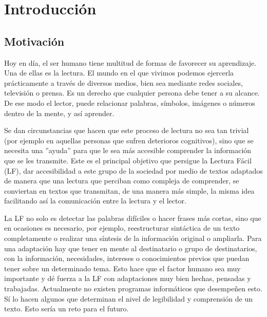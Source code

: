 \chapter{Introducción}
\label{cap:introduccion}


\section{Motivación}
Hoy en día, el ser humano tiene multitud de formas de favorecer su aprendizaje. Una de ellas es la lectura. El mundo en el que vivimos podemos ejercerla prácticamente a través de diversos medios, bien sea mediante redes sociales, televisión o prensa. Es un derecho que cualquier persona debe tener a su alcance. De ese modo el lector, puede relacionar palabras, símbolos, imágenes o números dentro de la mente, y así aprender.

 \setlength{\parskip}{10pt}

 Se dan circunstancias que hacen que este proceso de lectura no sea tan trivial (por ejemplo en aquellas personas que sufren deterioros cognitivos), sino que se necesita una ''ayuda'' para que le sea más accesible comprender la información que se les transmite. Este es el principal objetivo que persigue la Lectura Fácil (LF), dar accesibilidad a este grupo de la sociedad por medio de textos adaptados de manera que una lectura que perciban como compleja de comprender, se conviertan en textos que transmitan, de una manera más simple, la misma idea facilitando así la comunicación entre la lectura y el lector.
 
 \setlength{\parskip}{10pt}
 
La LF no solo es detectar las palabras difíciles o hacer frases más cortas, sino que en ocasiones es necesario, por ejemplo, reestructurar sintáctica de un texto completamente o realizar una síntesis de la información original o ampliarla. Para una adaptación hay que tener en mente al destinatario o grupo de destinatarios, con la información, necesidades, intereses o conocimientos previos que puedan tener sobre un determinado tema. Esto hace que el factor humano sea muy importante y dé fuerza a la LF con adaptaciones muy bien hechas, pensadas y trabajadas. Actualmente no existen programas informáticos que desempeñen esto. Sí lo hacen algunos que determinan el nivel de legibilidad y comprensión de un texto. Esto sería un reto para el futuro.  

